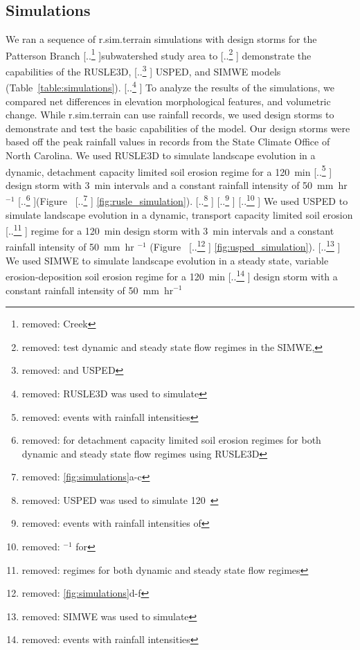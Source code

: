 \documentclass[gmd, manuscript]{copernicus}
\providecommand{\DIFadd}[1]{{\protect\color{blue} \sf #1}} %
\providecommand{\DIFdel}[1]{{\protect\color{red} [..\footnote{removed: #1} ]}} %
\providecommand{\DIFaddbegin}{} %
\providecommand{\DIFaddend}{} %
\providecommand{\DIFdelbegin}{} %
\providecommand{\DIFdelend}{} %
\begin{document}
\subsection{Simulations}
%
We ran a sequence of r.sim.terrain simulations 
\DIFaddbegin \DIFadd{with design storms
}\DIFaddend for the Patterson Branch \DIFdelbegin \DIFdel{Creek }\DIFdelend subwatershed study area
to \DIFdelbegin \DIFdel{test dynamic and steady state flow regimes
in the SIMWE, }\DIFdelend \DIFaddbegin \DIFadd{demonstrate the capabilities 
of the }\DIFaddend RUSLE3D, \DIFdelbegin \DIFdel{and USPED}\DIFdelend \DIFaddbegin \DIFadd{USPED, and SIMWE }\DIFaddend models
(Table~\ref{table:simulations}).
%
\DIFdelbegin \DIFdel{RUSLE3D was used to simulate }\DIFdelend \DIFaddbegin \DIFadd{To analyze the results of the simulations,
we compared 
net differences in elevation
morphological features,
and volumetric change.
While r.sim.terrain can use rainfall records,
we used design storms to demonstrate and test 
the basic capabilities of the model. 
Our design storms were based off the peak rainfall values
in records from the State Climate Office of North Carolina.
We used RUSLE3D to simulate landscape evolution
in a dynamic, detachment capacity limited soil erosion regime
for a }\DIFaddend 120~\unit{min} \DIFdelbegin \DIFdel{events
with rainfall intensities }\DIFdelend \DIFaddbegin \DIFadd{design storm
with 3~}\unit{min} \DIFadd{intervals 
and a constant rainfall intensity }\DIFaddend of 50~\unit{mm~hr}$^{-1}$
\DIFdelbegin \DIFdel{for detachment capacity limited soil erosion regimes
for both dynamic and steady state flow regimes
using RUSLE3D
}\DIFdelend (Figure~\DIFdelbegin \DIFdel{\ref{fig:simulations}a-c}\DIFdelend \DIFaddbegin \DIFadd{\ref{fig:rusle_simulation}}\DIFaddend ).
%
\DIFdelbegin \DIFdel{USPED was used to simulate 120~}%
\DIFdel{events
with rainfall intensities of }%
\DIFdel{$^{-1}$
for }\DIFdelend \DIFaddbegin \DIFadd{We used USPED to simulate landscape evolution
in a dynamic, }\DIFaddend transport capacity limited soil erosion \DIFdelbegin \DIFdel{regimes
for both dynamic and steady state flow regimes
}\DIFdelend \DIFaddbegin \DIFadd{regime
for a 120~}\unit{min} \DIFadd{design storm
with 3~}\unit{min} \DIFadd{intervals 
and a constant rainfall intensity of 50~}\unit{mm~hr}\DIFadd{$^{-1}$
}\DIFaddend (Figure~\DIFdelbegin \DIFdel{\ref{fig:simulations}d-f}\DIFdelend \DIFaddbegin \DIFadd{\ref{fig:usped_simulation}}\DIFaddend ).
%
\DIFdelbegin \DIFdel{SIMWE was used to simulate }\DIFdelend \DIFaddbegin \DIFadd{We used SIMWE to simulate landscape evolution
in a steady state, variable erosion-deposition soil erosion regime
for a }\DIFaddend 120~\unit{min} \DIFdelbegin \DIFdel{events 
with rainfall intensities }\DIFdelend \DIFaddbegin \DIFadd{design storm
with a constant rainfall intensity }\DIFaddend of 50~\unit{mm~hr}$^{-1}$
\end{document}
